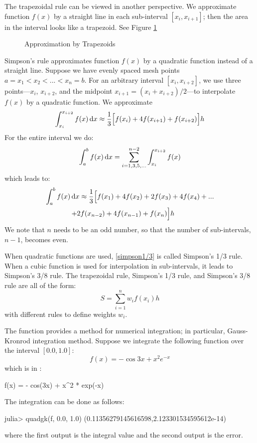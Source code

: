 The trapezoidal rule can be viewed in another perspective. We approximate function $f(x)$ by a straight line in each sub-interval $[x_i, x_{i+1}]$; then the area in the interval looks like a trapezoid. See Figure \ref{fig:trapezoidal}


\begin{figure}
	\caption{Approximation by Trapezoids \label{fig:trapezoidal}}
\end{figure}


Simpson's rule approximates function $f(x)$ by a quadratic function instead of a straight line. Suppose we have evenly spaced mesh points $a=x_1<x_2<...<x_n=b$. For an arbitrary interval $[x_i, x_{i+2}]$, we use three points---$x_i$, $x_{i+2}$, and the midpoint $x_{i+1}=(x_i+x_{i+2})/2$---to interpolate $f(x)$ by a quadratic function. We approximate
\[
	\int_{x_i}^{x_{i+2}} f(x) \mathop{}\!\mathrm{d}x \approx \frac{1}{3} \Big[f(x_i) + 4f(x_{i+1}) + f(x_{i+2})\Big] h
\]
For the entire interval we do:
\[
	\int_a^b f(x) \mathop{}\!\mathrm{d}x = \sum_{i=1,3,5,...}^{n-2} \int_{x_i}^{x_{i+2}} f(x)
\]
which leads to:
\begin{multline}
	\label{simpson1/3}
	\int_a^b f(x) \mathop{}\!\mathrm{d}x \approx \frac{1}{3}\Big[f(x_1)+4f(x_2)+2f(x_3)+4f(x_4)+...\\
				+2f(x_{n-2})+4f(x_{n-1})+f(x_n) \Big] h \qquad
\end{multline}
We note that $n$ needs to be an odd number, so that the number of sub-intervals, $n-1$, becomes even.

When quadratic functions are used, \eqref{simpson1/3} is called Simpson's 1/3 rule. When a cubic function is used for interpolation in sub-intervals, it leads to Simpson's 3/8 rule. The trapezoidal rule, Simpson's 1/3 rule, and Simpson's 3/8 rule are all of the form:
\[
S = \sum_{i=1}^{n} w_i f(x_i) h
\]
with different rules to define weights $w_i$.

The  function provides a method for numerical integration; in particular, Gauss-Kronrod integration method. Suppose we integrate the following function over the interval $[0.0, 1.0]$:
\[
	f(x) = - \cos 3x + x^2 e^{-x}
\]
which is in \julia{}:
\begin{code}
f(x) = - cos(3x) + x^2 * exp(-x)
\end{code}
\noindent The integration can be done as follows:
\begin{code}
julia> quadgk(f, 0.0, 1.0)
(0.11356279145616598,2.123301534595612e-14)
\end{code}
\noindent where the first output is the integral value and the second output is the error.











